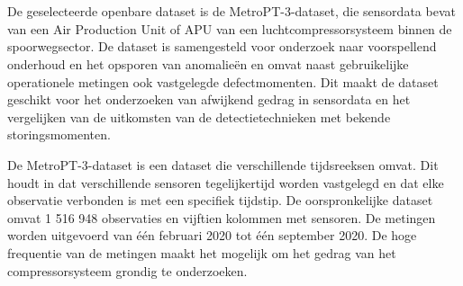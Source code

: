 
\section{}%
\label{sec: Beschrijving van de gekozen MetroPT-3-dataset}

De geselecteerde openbare dataset is de MetroPT-3-dataset, die sensordata bevat van een Air Production Unit of APU van een luchtcompressorsysteem binnen de spoorwegsector. De dataset is samengesteld voor onderzoek naar voorspellend onderhoud en het opsporen van anomalieën en omvat naast gebruikelijke operationele metingen ook vastgelegde defectmomenten. Dit maakt de dataset geschikt voor het onderzoeken van afwijkend gedrag in sensordata en het vergelijken van de uitkomsten van de detectietechnieken met bekende storingsmomenten.

De MetroPT-3-dataset is een dataset die verschillende tijdsreeksen omvat. Dit houdt in dat verschillende sensoren tegelijkertijd worden vastgelegd en dat elke observatie verbonden is met een specifiek tijdstip. De oorspronkelijke dataset omvat 1 516 948 observaties en vijftien kolommen met sensoren. De metingen worden uitgevoerd van één februari 2020 tot één september 2020. De hoge frequentie van de metingen maakt het mogelijk om het gedrag van het compressorsysteem grondig te onderzoeken.


